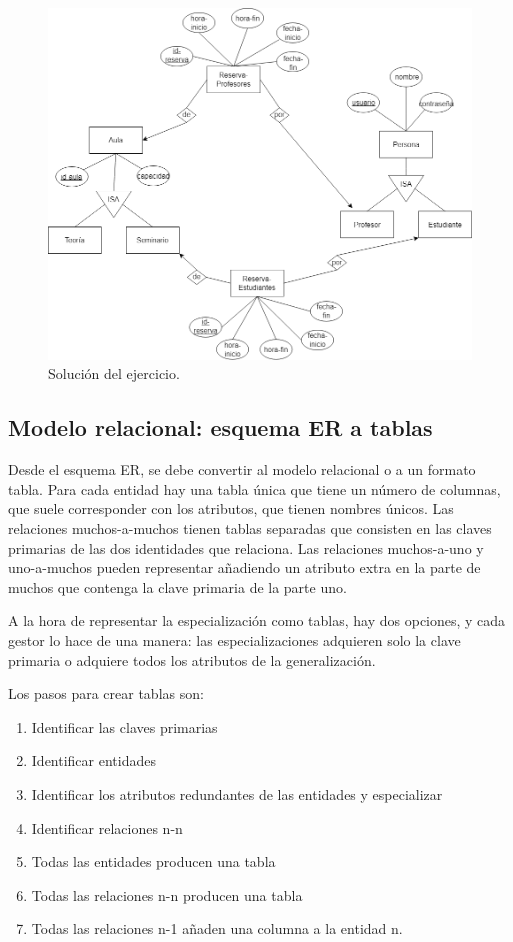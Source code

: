 \begin{figure}[htbp]
\centering
\includegraphics[width=0.7\linewidth]{figs/ejercicio-er-1.drawio.png}
\caption{Solución del ejercicio.}
\end{figure}

\subsection{Modelo relacional: esquema ER a tablas}
Desde el esquema ER, se debe convertir al modelo relacional o a un formato tabla. Para cada entidad hay una tabla única que tiene un número de columnas, que suele corresponder con los atributos, que tienen nombres únicos. Las relaciones muchos-a-muchos tienen tablas separadas que consisten en las claves primarias de las dos identidades que relaciona. Las relaciones muchos-a-uno y uno-a-muchos pueden representar añadiendo un atributo extra en la parte de muchos que contenga la clave primaria de la parte uno.

A la hora de representar la especialización como tablas, hay dos opciones, y cada gestor lo hace de una manera: las especializaciones adquieren solo la clave primaria o adquiere todos los atributos de la generalización.

Los pasos para crear tablas son:
\begin{enumerate}
\item Identificar las claves primarias
\item Identificar entidades
\item Identificar los atributos redundantes de las entidades y especializar
\item Identificar relaciones n-n
\item Todas las entidades producen una tabla
\item Todas las relaciones n-n producen una tabla
\item Todas las relaciones n-1 añaden una columna a la entidad n.
\end{enumerate}

